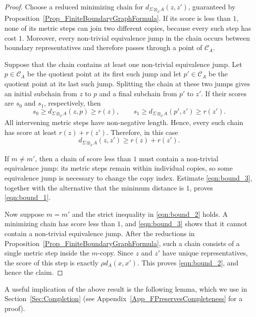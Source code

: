 \documentclass{sn-jnl}%
\theoremstyle{thmstyleone}%
\theoremstyle{thmstyletwo}%
\theoremstyle{thmstylethree}%
\newcommand{\M}{\Sigma}
\newcommand{\Fw}{\M\otimes_{\w}}
\newcommand{\w}{\rho}
\begin{document}
\begin{proof}
Choose a reduced minimizing chain for $d_{\Fw A}(z,z')$, guaranteed by Proposition~\ref{Prop_FiniteBoundaryGraphFormula}.  If its score is less than $1$, none of its metric steps can join two different copies, because every such step has cost $1$.  Moreover, every non-trivial equivalence jump in the chain occurs between boundary representatives and therefore passes through a point of $\mathcal C_A$.

Suppose that the chain contains at least one non-trivial equivalence jump. Let $p\in \mathcal C_A$ be the quotient point at its first such jump and let $p'\in \mathcal C_A$ be the quotient point at its last such jump.  Splitting the chain at these two jumps gives an initial subchain from $z$ to $p$ and a final subchain from $p'$ to $z'$.  If their scores are $s_0$ and $s_1$, respectively, then
\begin{equation} \nonumber
   s_0\geq d_{\Fw A}(z,p)\geq r(z), \qquad    s_1\geq d_{\Fw A}(p',z')\geq r(z').
\end{equation}
All intervening metric steps have non-negative length.  Hence, every such chain has score at least $ r(z)+r(z')$. Therefore, in this case
\begin{equation}
   d_{\Fw A}(z,z') \geq r(z)+r(z').
\label{eqn:bound_3}
\end{equation}

If $m\neq m'$, then a chain of score less than $1$ must contain a non-trivial equivalence jump: its metric steps remain within individual copies, so some equivalence jump is necessary to change the copy index. Estimate \eqref{eqn:bound_3}, together with the alternative that the minimum distance is $1$, proves \eqref{eqn:bound_1}.

Now suppose $m=m'$ and the strict inequality in \eqref{eqn:bound_2} holds.  A minimizing chain has score less than $1$, and \eqref{eqn:bound_3} shows that it cannot contain a non-trivial equivalence jump.  After the reductions in Proposition~\ref{Prop_FiniteBoundaryGraphFormula}, such a chain consists of a single metric step inside the $m$-copy.  Since $z$ and $z'$ have unique representatives, the score of this step is exactly $\rho d_A(x,x')$.  This proves \eqref{eqn:bound_2}, and hence the claim.
\end{proof}

A useful implication of the above result is the following lemma, which we use in Section~\ref{Sec:Completion} (see Appendix~\ref{App_FPreservesCompleteness} for a proof). 
\end{document}
